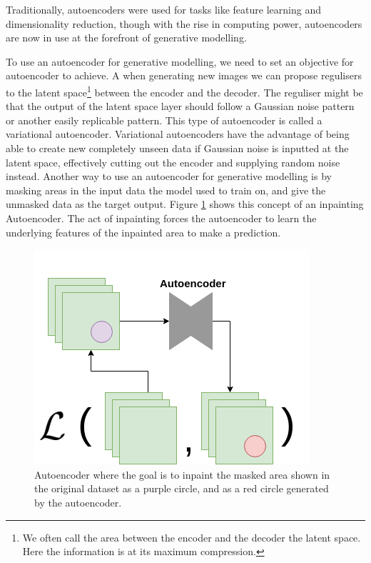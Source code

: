 Traditionally, autoencoders were used for tasks like feature learning and dimensionality reduction, though with the rise in computing power, autoencoders are now in use at the forefront of generative modelling.

To use an autoencoder for generative modelling, we need to set an objective for autoencoder to achieve.
A when generating new images we can propose regulisers to the latent space\footnote{We often call the area between the encoder and the decoder the latent space. Here the information is at its maximum compression.} between the encoder and the decoder. The reguliser might be that the output of the latent space layer should follow a Gaussian noise pattern or another easily replicable pattern. 
This type of autoencoder is called a variational autoencoder. Variational autoencoders have the advantage of being able to create new completely unseen data if Gaussian noise is inputted at the latent space, effectively cutting out the encoder and supplying random noise instead.
Another way to use an autoencoder for generative modelling is by masking areas in the input data the model used to train on, and give the unmasked data as the target output.
Figure \ref{fig:AEinpainting} shows this concept of an inpainting Autoencoder. The act of inpainting forces the autoencoder to learn the underlying features of the inpainted area to make a prediction. 

\begin{figure}[h]
    \centering
    \includegraphics[scale=0.6]{background/figures/AE_for_inpainting.png}
    \caption{Autoencoder where the goal is to inpaint the masked area shown in the original dataset as a purple circle, and as a red circle generated by the autoencoder.}
    \label{fig:AEinpainting}
\end{figure}



